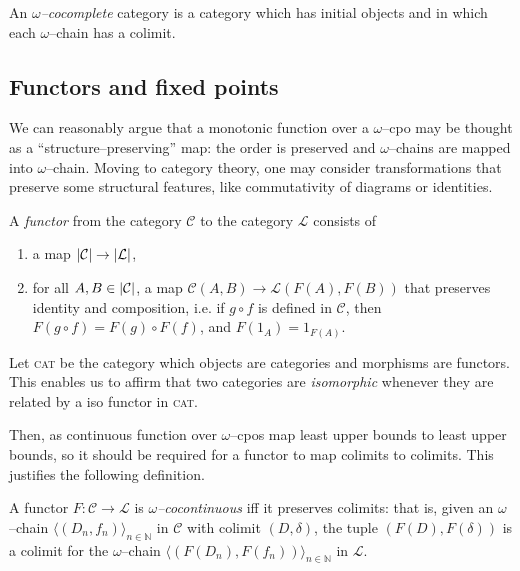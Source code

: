 \begin{dfn}
  An \emph{\(\omega\)--cocomplete} category is a category which has initial objects and in which each \(\omega\)--chain has a colimit. %
\end{dfn}

\subsection{Functors and fixed points}

We can reasonably argue that a monotonic function over a \(\omega\)--cpo may be thought as a ``structure--preserving'' map: the order is preserved and \(\omega\)--chains are mapped into \(\omega\)--chain. %
Moving to category theory, one may consider transformations that preserve some structural features, like commutativity of diagrams or identities.

\begin{dfn}
  A \emph{functor} from the category \(\mathcal{C}\) to the category \(\mathcal{L}\) consists of
  \begin{enumerate}
    \item a map \(\lvert \mathcal{C} \rvert \to \lvert \mathcal{L} \rvert\),
    \item for all \(A, B \in \lvert \mathcal{C} \rvert\), a map \(\mathcal{C}(A,B) \to \mathcal{L}(F(A),F(B))\) that preserves identity and composition, i.e.
      if \(g \circ f\) is defined in \(\mathcal{C}\), then
            \(F(g \circ f) = F(g) \circ F(f)\), and
            \(F(1_A) = 1_{F(A)}\).
  \end{enumerate}
\end{dfn}

\begin{rem}
  Let \textsc{cat} be the category which objects are categories and morphisms are functors. This enables us to affirm that two categories are \emph{isomorphic} whenever they are related by a iso functor in \textsc{cat}.
\end{rem}

Then, as continuous function over \(\omega\)--cpos map least upper bounds to least upper bounds, so it should be required for a functor to map colimits to colimits. This justifies the following definition. %

\begin{dfn}
  A functor \(F \colon \mathcal{C} \to \mathcal{L}\) is \emph{\(\omega\)--cocontinuous} iff it preserves colimits: that is, given an \(\omega\)--chain \({\langle (D_n,f_n) \rangle}_{n \in \mathbb{N}}\) in \(\mathcal{C}\) with colimit \((D,\delta)\), the tuple \((F(D),F(\delta))\) is a colimit for the \(\omega\)--chain \({\langle (F(D_n),F(f_n)) \rangle}_{n \in \mathbb{N}}\) in \(\mathcal{L}\). %
\end{dfn}


